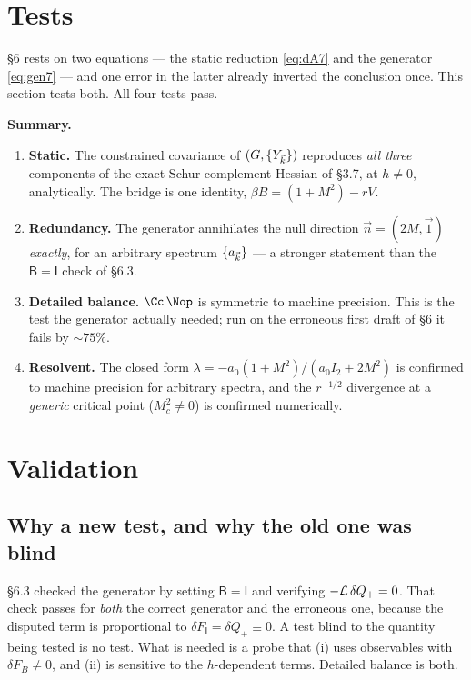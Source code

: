 \section{Tests}

\noindent
\S6 rests on two equations --- the static reduction \eqref{eq:dA7} and the generator
\eqref{eq:gen7} --- and one error in the latter already inverted the conclusion once. This
section tests both. All four tests pass.

\medskip
\noindent
\textbf{Summary.}
\begin{enumerate}
  \item[(a)] \textbf{Static.} The constrained covariance of $(G,\{Y_{\vec k}\})$ reproduces
        \emph{all three} components of the exact Schur-complement Hessian of \S3.7, at
        $h\neq0$, analytically. The bridge is one identity, $\beta B=(1+M^{2})-rV$.
  \item[(b)] \textbf{Redundancy.} The generator annihilates the null direction
        $\vec n=(2M,\vec1)$ \emph{exactly}, for an arbitrary spectrum $\{a_{\vec k}\}$ --- a
        stronger statement than the $\mathsf B=\mathsf I$ check of \S6.3.
  \item[(c)] \textbf{Detailed balance.} $\Cc\,\Nop$ is symmetric to machine precision. This
        is the test the generator actually needed; run on the erroneous first draft of \S6
        it fails by $\sim75\%$.
  \item[(d)] \textbf{Resolvent.} The closed form
        $\lambda=-a_0(1+M^{2})/(a_0I_2+2M^{2})$ is confirmed to machine precision for
        arbitrary spectra, and the $r^{-1/2}$ divergence at a \emph{generic} critical point
        ($M_c^{2}\neq0$) is confirmed numerically.
\end{enumerate}

\section{Validation}

\subsection{Why a new test, and why the old one was blind}
\S6.3 checked the generator by setting $\mathsf B=\mathsf I$ and verifying
$-\mathcal{L}\,\delta Q_+=0$. That check passes for \emph{both} the correct generator and the
erroneous one, because the disputed term is proportional to $\delta F_{\mathsf I}=\delta Q_+\equiv0$.
A test blind to the quantity being tested is no test. What is needed is a probe that
(i) uses observables with $\delta F_B\neq0$, and (ii) is sensitive to the $h$-dependent
terms. Detailed balance is both.

